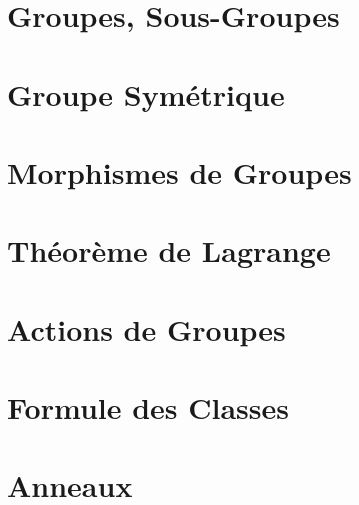 



\chapter{Groupes, Sous-Groupes}


\chapter{Groupe Symétrique}


\chapter{Morphismes de Groupes}


\chapter{Théorème de Lagrange}


\chapter{Actions de Groupes}


\chapter{Formule des Classes}


\chapter{Anneaux}


